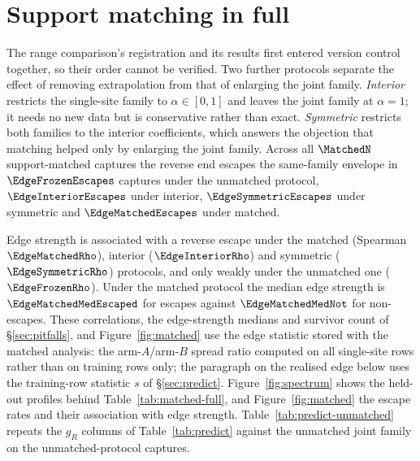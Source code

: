 \section{Support matching in full}
\label{app:matched}

The range comparison's registration and its results first entered version control together,
so their order cannot be verified. Two further protocols separate the effect of removing extrapolation from that of enlarging the joint family.
\emph{Interior} restricts the single-site family to $\alpha\in[0,1]$ and leaves the joint family at $\alpha=1$; it
needs no new data but is conservative rather than exact. \emph{Symmetric} restricts both families to the interior
coefficients, which answers the objection that matching helped only by enlarging the joint family. Across all
$\MatchedN$ support-matched captures the reverse end escapes the same-family envelope in $\EdgeFrozenEscapes$
captures under the unmatched protocol, $\EdgeInteriorEscapes$ under interior, $\EdgeSymmetricEscapes$ under symmetric
and $\EdgeMatchedEscapes$ under matched.

Edge strength is associated with a reverse escape under the matched (Spearman $\EdgeMatchedRho$), interior
($\EdgeInteriorRho$) and symmetric ($\EdgeSymmetricRho$) protocols, and only weakly under the unmatched one
($\EdgeFrozenRho$). Under the matched protocol the median edge strength is $\EdgeMatchedMedEscaped$ for escapes against
$\EdgeMatchedMedNot$ for non-escapes. These correlations, the edge-strength medians and survivor count of \S\ref{sec:pitfalls}, and
Figure~\ref{fig:matched} use the edge statistic stored with the matched analysis: the arm-$A$/arm-$B$ spread ratio
computed on all single-site rows rather than on training rows only; the paragraph on the realised edge below uses the
training-row statistic $s$ of \S\ref{sec:predict}. Figure~\ref{fig:spectrum} shows the held-out profiles behind
Table~\ref{tab:matched-full}, and Figure~\ref{fig:matched} the escape rates and their association with edge strength.
Table~\ref{tab:predict-unmatched} repeats the $g_R$ columns of Table~\ref{tab:predict} against the unmatched joint
family on the unmatched-protocol captures.

